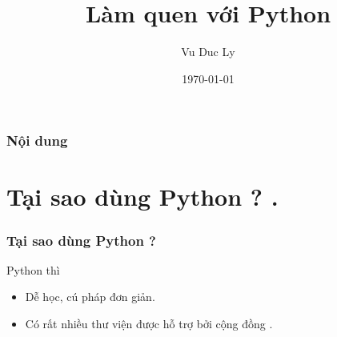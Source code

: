 \documentclass{beamer}
\title[Làm quen với Python]{Làm quen với Python } %
\author{Vu Duc Ly} %
\date{\today} %
\begin{document}
\begin{frame}
\titlepage %
\hyperlink{intro}{}
\end{frame}

\begin{frame}[label=intro]
\frametitle{Nội dung} %
\tableofcontents %
\end{frame}


\section{Tại sao dùng Python ? .} 
\begin{frame}[label=taisao]
\frametitle{Tại sao dùng Python ?}
Python thì
\begin{itemize}
\item Dễ học, cú pháp đơn giản.
\item Có rất nhiều thư viện được hỗ trợ bởi cộng đồng .
\end{itemize} 

\hyperlink{currentwork}{}
\hyperlink{model}{}
\end{frame}
\end{document}
